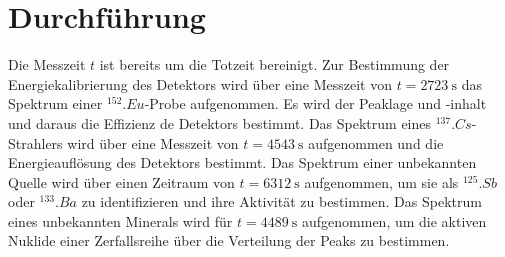 \section{Durchführung}
\label{sec:Durchführung}
Die Messzeit $t$ ist bereits um die Totzeit bereinigt.
Zur Bestimmung der Energiekalibrierung des Detektors wird über eine Messzeit von $t=\SI{2723}{\second}$ das Spektrum einer $^{152}.{Eu}$-Probe aufgenommen.
Es wird der Peaklage und -inhalt und daraus die Effizienz de Detektors bestimmt.
Das Spektrum eines $^{137}.{Cs}$-Strahlers wird über eine Messzeit von $t=\SI{4543}{\second}$ aufgenommen und die Energieauflösung des Detektors bestimmt.
Das Spektrum einer unbekannten Quelle wird über einen Zeitraum von $t=\SI{6312}{\second}$ aufgenommen, um sie  als $^{125}.{Sb}$ oder $^{133}.{Ba}$ zu identifizieren und ihre Aktivität zu bestimmen.
Das Spektrum eines unbekannten Minerals wird für $t=\SI{4489}{\second} $ aufgenommen, um die aktiven Nuklide einer Zerfallsreihe über die Verteilung der Peaks zu bestimmen.